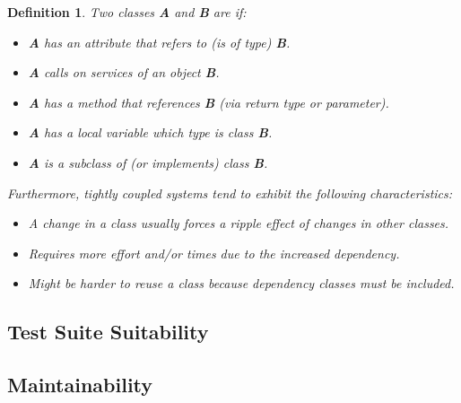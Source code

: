 \documentclass[12pt]{article}
\DeclareRobustCommand{\ul}[1]{%
	\uline{\phantom{#1}}%
	\llap{\contour{white}{#1}}%
}
\newtheorem*{definition}{Definition}
\begin{document}
\begin{definition}
    Two classes \textbf{A} and \textbf{B} are \ul{coupled} if:
    \begin{itemize}
        \item \textbf{A} has an attribute that refers to (is of type)
            \textbf{B}.
        \item \textbf{A} calls on services of an object
            \textbf{B}.
        \item \textbf{A} has a method that references \textbf{B}
            (via return type or parameter).
        \item \textbf{A} has a local variable which type is
            class \textbf{B}.
        \item \textbf{A} is a subclass of (or implements) class
            \textbf{B}.
    \end{itemize}

    Furthermore, tightly coupled systems tend to exhibit the
    following characteristics:
    \begin{itemize}
        \item A change in a class usually forces a ripple effect
            of changes in other classes.
        \item Requires more effort and/or times due to the
            increased dependency.
        \item Might be harder to reuse a class because
            dependency classes must be included.
    \end{itemize}

\end{definition}

\subsection{Test Suite Suitability}

\subsection{Maintainability}
\end{document}
